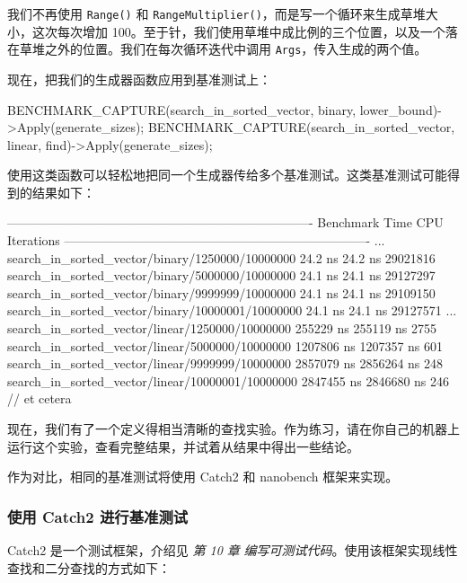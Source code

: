 我们不再使用 \texttt{Range()} 和 \texttt{Range\allowbreak{}Multiplier(\allowbreak{})\allowbreak{}}，而是写一个循环来生成草堆大小，这次每次增加 100。至于针，我们使用草堆中成比例的三个位置，以及一个落在草堆之外的位置。我们在每次循环迭代中调用 \texttt{Args}，传入生成的两个值。

现在，把我们的生成器函数应用到基准测试上：

\begin{codebox}[text]
BENCHMARK_CAPTURE(search_in_sorted_vector, binary, lower_bound)->Apply(generate_sizes);
BENCHMARK_CAPTURE(search_in_sorted_vector, linear, find)->Apply(generate_sizes);
\end{codebox}

\label{idx:1173}
使用这类函数可以轻松地把同一个生成器传给多个基准测试。这类基准测试可能得到的结果如下：

\begin{codebox}[text]
-------------------------------------------------------------------------
Benchmark                                        Time     CPU  Iterations
-------------------------------------------------------------------------
...
search_in_sorted_vector/binary/1250000/10000000        24.2 ns         24.2 ns     29021816
search_in_sorted_vector/binary/5000000/10000000        24.1 ns         24.1 ns     29127297
search_in_sorted_vector/binary/9999999/10000000        24.1 ns         24.1 ns     29109150
search_in_sorted_vector/binary/10000001/10000000       24.1 ns         24.1 ns     29127571
...
search_in_sorted_vector/linear/1250000/10000000      255229 ns       255119 ns         2755
search_in_sorted_vector/linear/5000000/10000000     1207806 ns      1207357 ns          601
search_in_sorted_vector/linear/9999999/10000000     2857079 ns      2856264 ns          248
search_in_sorted_vector/linear/10000001/10000000    2847455 ns      2846680 ns          246
// et cetera
\end{codebox}

现在，我们有了一个定义得相当清晰的查找实验。作为练习，请在你自己的机器上运行这个实验，查看完整结果，并试着从结果中得出一些结论。

作为对比，相同的基准测试将使用 Catch2 和 nanobench 框架来实现。

\subsubsection{使用 Catch2 进行基准测试}

\label{idx:1174}
\label{idx:1175}
Catch2 是一个测试框架，介绍见 \emph{第 10 章} \emph{编写可测试代码}。使用该框架实现线性查找和二分查找的方式如下：

